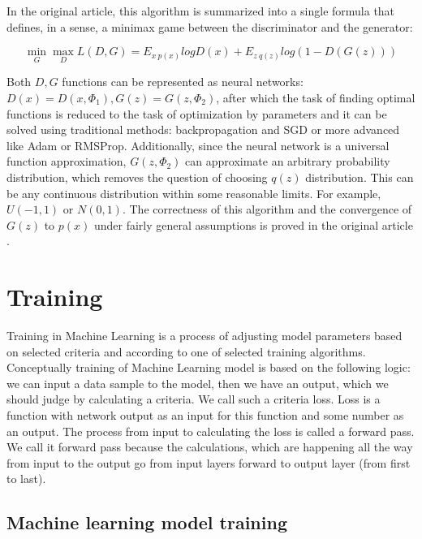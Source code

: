 In the original article, this algorithm is summarized into a single formula that defines, in a sense, a minimax game between the discriminator and the generator:

\begin{equation}
    \label{eq:gan-4}
    \min_{G}\max_{D} L(D, G) = E_{x~p(x)} log D(x) + E_{z~q(z)} log(1-D(G(z)))
\end{equation}

Both $D, G$ functions can be represented as neural networks: $D(x) = D(x, \Phi_1), G(z) = G(z, \Phi_2)$, after which the task of finding optimal functions is reduced to the task of optimization by parameters and it can be solved using traditional methods: backpropagation and SGD or more advanced like Adam or RMSProp. Additionally, since the neural network is a universal function approximation, $G(z, \Phi_2)$ can approximate an arbitrary probability distribution, which removes the question of choosing $q(z)$ distribution. This can be any continuous distribution within some reasonable limits. For example, $U(-1, 1)$ or $N(0, 1)$. The correctness of this algorithm and the convergence of $G(z)$ to $p(x)$ under fairly general assumptions is proved in the original article \cite{Goodfellow_Pouget-Abadie_Mirza_Xu_Warde-Farley_Ozair_Courville_Bengio_2014}.

\section{Training}

Training in Machine Learning is a process of adjusting model parameters based on selected criteria and according to one of selected training algorithms. Conceptually training of Machine Learning model is based on the following logic: we can input a data sample to the model, then we have an output, which we should judge by calculating a criteria. We call such a criteria loss. Loss is a function with network output as an input for this function and some number as an output. The process from input to calculating the loss is called a forward pass. We call it forward pass because the calculations, which are happening all the way from input to the output go from input layers forward to output layer (from first to last).

\subsection{Machine learning model training}

